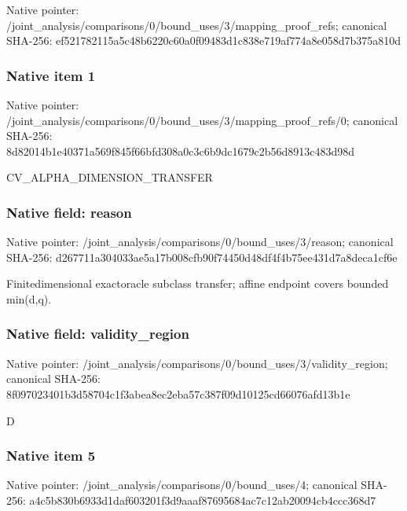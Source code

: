 \documentclass[10pt,a4paper]{article}
\begin{document}
Native pointer: /joint\_analysis/comparis\allowbreak{}ons/0/bound\_uses/3/mappi\allowbreak{}ng\_proof\_refs; canonical SHA-256: ef521782115a5c48b6220c60\allowbreak{}a0f09483d1c838e719af774a\allowbreak{}8e058d7b375a810d



\subsubsection{Native item 1}


Native pointer: /joint\_analysis/comparis\allowbreak{}ons/0/bound\_uses/3/mappi\allowbreak{}ng\_proof\_refs/0; canonical SHA-256: 8d82014b1e40371a569f845f\allowbreak{}66bfd308a0c3c6b9dc1679c2\allowbreak{}b56d8913c483d98d


CV\_ALPHA\_DIMENSION\_TRANSFER


\subsubsection{Native field: reason}


Native pointer: /joint\_analysis/comparis\allowbreak{}ons/0/bound\_uses/3/reaso\allowbreak{}n; canonical SHA-256: d267711a304033ae5a17b008\allowbreak{}cfb90f74450d48df4f4b75ee\allowbreak{}431d7a8deca1cf6e


Finitedimensional exactoracle subclass transfer; affine endpoint covers bounded min(d,q).


\subsubsection{Native field: validity\_region}


Native pointer: /joint\_analysis/comparis\allowbreak{}ons/0/bound\_uses/3/valid\allowbreak{}ity\_region; canonical SHA-256: 8f097023401b3d58704c1f3a\allowbreak{}bea8ec2eba57c387f09d1012\allowbreak{}5cd66076afd13b1e


D


\subsubsection{Native item 5}


Native pointer: /joint\_analysis/comparis\allowbreak{}ons/0/bound\_uses/4; canonical SHA-256: a4c5b830b6933d1daf603201\allowbreak{}f3d9aaaf87695684ac7c12ab\allowbreak{}20094cb4ccc368d7
\end{document}
